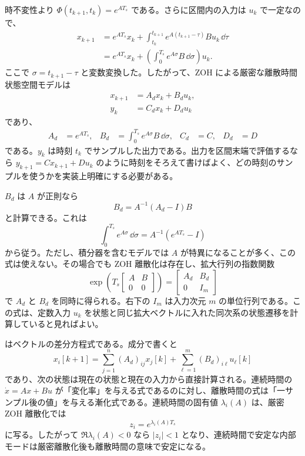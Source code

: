 時不変性より $\Phi(t_{k+1},t_k)=e^{AT_s}$ である。さらに区間内の入力は $u_k$ で一定なので、
\begin{align}
  x_{k+1}
  &=e^{AT_s}x_k
    +\int_{t_k}^{t_{k+1}}e^{A(t_{k+1}-\tau)}B u_k\,\dd\tau\\
  &=e^{AT_s}x_k
    +\left(\int_{0}^{T_s}e^{A\sigma}B\,\dd\sigma\right)u_k.
    \label{eq:zoh-state-update}
\end{align}
ここで $\sigma=t_{k+1}-\tau$ と変数変換した。したがって、ZOH による厳密な離散時間状態空間モデルは
\begin{align}
  x_{k+1}&=A_d x_k+B_d u_k,\\
  y_k&=C_d x_k+D_d u_k
  \label{eq:discrete-state-space}
\end{align}
であり、
\begin{align}
  A_d&=e^{AT_s},&
  B_d&=\int_{0}^{T_s}e^{A\sigma}B\,\dd\sigma,&
  C_d&=C,&
  D_d&=D
  \label{eq:zoh-exact-discretization}
\end{align}
である。$y_k$ は時刻 $t_k$ でサンプルした出力である。出力を区間末端で評価するなら $y_{k+1}=Cx_{k+1}+Du_k$ のように時刻をそろえて書けばよく、どの時刻のサンプルを使うかを実装上明確にする必要がある。

$B_d$ は $A$ が正則なら
\begin{equation}
  B_d=A^{-1}(A_d-I)B
  \label{eq:zoh-bd-nonsingular}
\end{equation}
と計算できる。これは
\begin{equation}
  \int_0^{T_s}e^{A\sigma}\,\dd\sigma
  =A^{-1}(e^{AT_s}-I)
\end{equation}
から従う。ただし、積分器を含むモデルでは $A$ が特異になることが多く、この式は使えない。その場合でも ZOH 離散化は存在し、拡大行列の指数関数
\begin{equation}
  \exp\left(
    T_s
    \begin{bmatrix}
      A&B\\
      0&0
    \end{bmatrix}
  \right)
  =
  \begin{bmatrix}
    A_d&B_d\\
    0&I_m
  \end{bmatrix}
  \label{eq:zoh-block-exponential}
\end{equation}
で $A_d$ と $B_d$ を同時に得られる。右下の $I_m$ は入力次元 $m$ の単位行列である。この式は、定数入力 $u_k$ を状態と同じ拡大ベクトルに入れた同次系の状態遷移を計算していると見ればよい。

 はベクトルの差分方程式である。成分で書くと
\begin{equation}
  x_i[k+1]
  =\sum_{j=1}^{n}(A_d)_{ij}x_j[k]
   +\sum_{\ell=1}^{m}(B_d)_{i\ell}u_\ell[k]
\end{equation}
であり、次の状態は現在の状態と現在の入力から直接計算される。連続時間の $\dot{x}=Ax+Bu$ が「変化率」を与える式であるのに対し、離散時間の式は「一サンプル後の値」を与える漸化式である。連続時間の固有値 $\lambda_i(A)$ は、厳密 ZOH 離散化では
\begin{equation}
  z_i=e^{\lambda_i(A)T_s}
  \label{eq:continuous-discrete-pole-map}
\end{equation}
に写る。したがって $\Re\lambda_i(A)<0$ なら $|z_i|<1$ となり、連続時間で安定な内部モードは厳密離散化後も離散時間の意味で安定になる。


